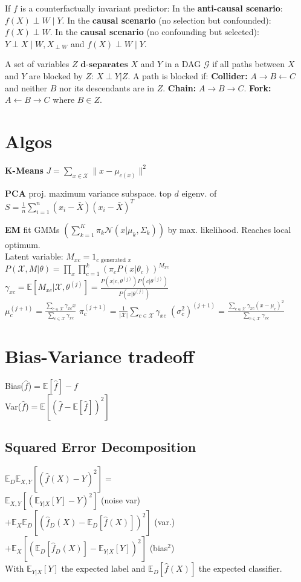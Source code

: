 If $f$ is a counterfactually invariant predictor:
In the \textbf{anti-causal scenario}: $f(X) {\perp} W {\mid} Y$.
In the \textbf{causal scenario} (no selection but confounded): $f(X) {\perp} W$.
In the \textbf{causal scenario} (no confounding but selected): $Y \perp X \mid W, X_{\perp W}$ and $f(X) \perp W \mid Y$.

A set of variables $Z$ $\textbf{d-separates}$ $X$ and $Y$ in a DAG $\mathcal{G}$ if all paths between $X$ and $Y$ are blocked by $Z$: $ X{\perp} Y | Z$. A path is blocked if:
\textbf{Collider:} $A {\to} B {\leftarrow} C$ and neither $B$ nor its descendants are in $Z$.
\textbf{Chain:} $A {\to} B {\to} C$. \textbf{Fork:} $A {\leftarrow} B {\to} C$ where $B \in Z$.

\section*{Algos}
\textbf{K-Means} 
$J {=} \sum_{x \in \mathcal{X}} \| x - \mu_{c(x)} \|^2$

\textbf{PCA} proj. maximum variance subspace.
top $d$ eigenv. of $S {=} \frac{1}{n} \sum_{i=1}^{n} (x_i {-} \bar{X})(x_i {-} \bar{X})^T$

\textbf{EM} fit GMMs $(\sum_{k=1}^{K} \pi_k \mathcal{N}(x | \mu_k, \Sigma_k))$ by max. likelihood. Reaches local optimum.\\
Latent variable: $M_{xc} = 1_{c \text{ generated } x}$ \\
$P(\mathcal{X}, M | \theta) {=} \prod_{x} \prod_{c=1}^{k} (\pi_c P(x | \theta_c))^{M_{xc}}$
$\gamma_{xc} {=} \mathbb{E}[M_{xc} | \mathcal{X}, \theta^{(j)}] {=} \frac{P(x | c, \theta^{(j)}) P(c | \theta^{(j)})}{P(x | \theta^{(j)})}$ \\
$\mu_c^{(j+1)} {=} \frac{\sum_{c \in \mathcal{X}} \gamma_{xc} x}{\sum_{c \in \mathcal{X}} \gamma_{xc}}$
$\pi_c^{(j+1)} {=} \frac{1}{|\mathcal{X}|} \sum_{c \in \mathcal{X}} \gamma_{xc}$ 
$(\sigma_c^2)^{(j+1)} {=} \frac{\sum_{c \in \mathcal{X}} \gamma_{xc} (x - \mu_c)^2}{\sum_{c \in \mathcal{X}} \gamma_{xc}}$ \\

\section*{Bias-Variance tradeoff}
Bias($\hat{f}$)$=\mathbb{E}[\hat{f}]-f$\\
Var($\hat{f}$)$=\mathbb{E}[(\hat{f}-\mathbb{E}[\hat{f}])^2]$
\subsection*{Squared Error Decomposition}
$\mathbb{E}_D\mathbb{E}_{X,Y}[(\hat{f}(X)-Y)^2]=$\\
$\mathbb{E}_{X,Y}[(\mathbb{E}_{Y|X}[Y]-Y)^2]$ (noise var)\\
$+\mathbb{E}_X\mathbb{E}_D[(\hat{f}_D(X)-\mathbb{E}_D[\hat{f}(X)])^2]$ (var.)\\
$+\mathbb{E}_X[(\mathbb{E}_D[\hat{f}_D(X)]-\mathbb{E}_{Y|X}[Y])^2]$ (bias$^2$)\\
With $\mathbb{E}_{Y|X}[Y]$ the expected label and $\mathbb{E}_{D}[\hat{f}(X)]$ the expected classifier.

